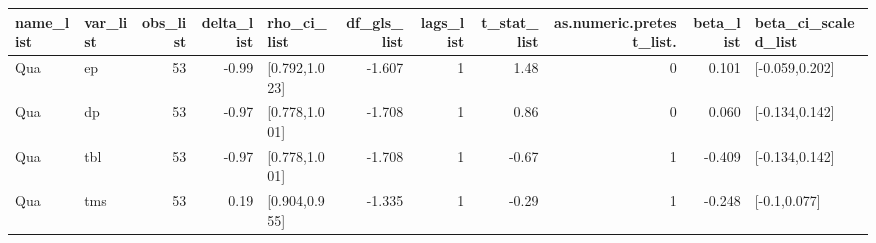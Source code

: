 \begin{table}[ht]
\centering
\begin{tabular}{llrrlrrrrrl}
  \hline
name\_list & var\_list & obs\_list & delta\_list & rho\_ci\_list & df\_gls\_list & lags\_list & t\_stat\_list & as.numeric.pretest\_list. & beta\_list & beta\_ci\_scaled\_list \\ 
  \hline
Qua & ep & 53 & -0.99 & [0.792,1.023] & -1.607 & 1 & 1.48 & 0 & 0.101 & [-0.059,0.202] \\ 
  Qua & dp & 53 & -0.97 & [0.778,1.001] & -1.708 & 1 & 0.86 & 0 & 0.060 & [-0.134,0.142] \\ 
  Qua & tbl & 53 & -0.97 & [0.778,1.001] & -1.708 & 1 & -0.67 & 1 & -0.409 & [-0.134,0.142] \\ 
  Qua & tms & 53 & 0.19 & [0.904,0.955] & -1.335 & 1 & -0.29 & 1 & -0.248 & [-0.1,0.077] \\ 
   \hline
\end{tabular}
\end{table}
